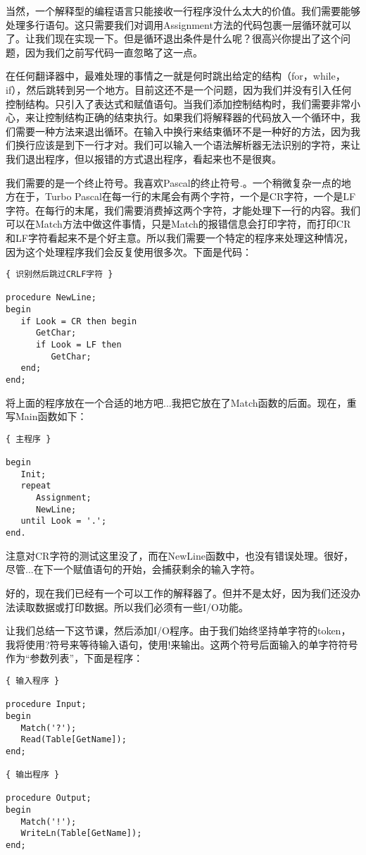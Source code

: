 当然，一个解释型的编程语言只能接收一行程序没什么太大的价值。我们需要能够处理多行语句。这只需要我们对调用Assignment方法的代码包裹一层循环就可以了。让我们现在实现一下。但是循环退出条件是什么呢？很高兴你提出了这个问题，因为我们之前写代码一直忽略了这一点。

在任何翻译器中，最难处理的事情之一就是何时跳出给定的结构（for，while，if），然后跳转到另一个地方。目前这还不是一个问题，因为我们并没有引入任何控制结构。只引入了表达式和赋值语句。当我们添加控制结构时，我们需要非常小心，来让控制结构正确的结束执行。如果我们将解释器的代码放入一个循环中，我们需要一种方法来退出循环。在输入中换行来结束循环不是一种好的方法，因为我们换行应该是到下一行才对。我们可以输入一个语法解析器无法识别的字符，来让我们退出程序，但以报错的方式退出程序，看起来也不是很爽。

我们需要的是一个终止符号。我喜欢Pascal的终止符号.。一个稍微复杂一点的地方在于，Turbo Pascal在每一行的末尾会有两个字符，一个是CR字符，一个是LF字符。在每行的末尾，我们需要消费掉这两个字符，才能处理下一行的内容。我们可以在Match方法中做这件事情，只是Match的报错信息会打印字符，而打印CR和LF字符看起来不是个好主意。所以我们需要一个特定的程序来处理这种情况，因为这个处理程序我们会反复使用很多次。下面是代码：

\begin{verbatim}
{ 识别然后跳过CRLF字符 }

procedure NewLine;
begin
   if Look = CR then begin
      GetChar;
      if Look = LF then
         GetChar;
   end;
end;
\end{verbatim}

将上面的程序放在一个合适的地方吧...我把它放在了Match函数的后面。现在，重写Main函数如下：

\begin{verbatim}
{ 主程序 }

begin
   Init;
   repeat
      Assignment;
      NewLine;
   until Look = '.';
end.
\end{verbatim}

注意对CR字符的测试这里没了，而在NewLine函数中，也没有错误处理。很好，尽管...在下一个赋值语句的开始，会捕获剩余的输入字符。

好的，现在我们已经有一个可以工作的解释器了。但并不是太好，因为我们还没办法读取数据或打印数据。所以我们必须有一些I/O功能。

让我们总结一下这节课，然后添加I/O程序。由于我们始终坚持单字符的token，我将使用?符号来等待输入语句，使用!来输出。这两个符号后面输入的单字符符号作为“参数列表”，下面是程序：

\begin{verbatim}
{ 输入程序 }

procedure Input;
begin
   Match('?');
   Read(Table[GetName]);
end;

{ 输出程序 }

procedure Output;
begin
   Match('!');
   WriteLn(Table[GetName]);
end;
\end{verbatim}

